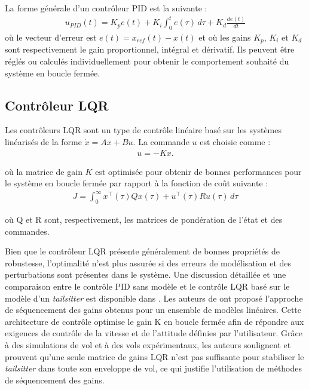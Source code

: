 La forme générale d'un contrôleur PID est la suivante :
\begin{align}
    u_{PID}(t) = K_{p} e(t) + K_{i} \int_{0}^{t} e(\tau) \,d\tau + K_{d} \frac{d e(t)}{dt}
\end{align}
où le vecteur d'erreur est $e(t) = x_{ref} (t) - x(t)$ et où les gains $K_{p}$, $K_{i}$ et $K_{d}$ sont respectivement le gain proportionnel, intégral et dérivatif. Ils peuvent être réglés ou calculés individuellement pour obtenir le comportement souhaité du système en boucle fermée.

\subsection*{Contrôleur LQR}
\label{sec:LQR}
Les contrôleurs LQR sont un type de contrôle linéaire basé sur les systèmes linéarisés de la forme $\dot{x} = Ax+Bu$. La commande $u$ est
choisie comme :
\begin{align*}
    u = -Kx.
\end{align*}

où la matrice de gain $K$ est optimisée pour obtenir de bonnes performances pour le système en boucle fermée par rapport à la fonction de coût suivante :
\begin{align*}
    J = \int_{0}^{\infty} x^{\top}(\tau)Q x(\tau) + u^{\top}(\tau)R u(\tau) \,d\tau
\end{align*}

où Q et R sont, respectivement, les matrices de pondération de l'état et des commandes. 

Bien que le contrôleur LQR présente généralement de bonnes propriétés de robustesse, l'optimalité n'est plus assurée si des erreurs de modélisation et des perturbations sont présentes dans le système. Une discussion détaillée et une comparaison entre le contrôle PID sans modèle et le contrôle LQR basé sur le modèle d'un \textit{tailsitter} est disponible dans \cite{BarthCondomines2018}.
Les auteurs de \cite{Lustosa2017LaP} ont proposé l'approche de séquencement des gains obtenus pour un ensemble de modèles linéaires. Cette architecture de contrôle optimise le gain K en boucle fermée afin de répondre aux exigences de contrôle de la vitesse et de l'attitude définies par l'utilisateur. Grâce à des simulations de vol et à des vols expérimentaux, les auteurs soulignent et prouvent qu'une seule matrice de gains LQR n'est pas suffisante pour stabiliser le \textit{tailsitter} dans toute son enveloppe de vol, ce qui justifie l'utilisation de méthodes de séquencement des gains.


